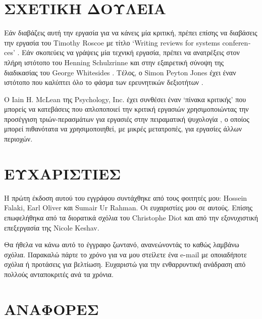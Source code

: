 \documentclass{article}
\begin{document}
\section{ΣΧΕΤΙΚΗ ΔΟΥΛΕΙΑ}
\par
Εάν διαβάζεις αυτή την εργασία για να κάνεις μία κριτική, πρέπει επίσης να διαβάσεις την εργασία του \textlatin{Timothy Roscoe} με τίτλο \textlatin{\enquote*{Writing reviews for systems conferences}} \cite{3writingReviewsForSystemsConferences}. Εάν σκοπεύεις να γράψεις μία τεχνική εργασία, πρέπει να ανατρέξεις στον πλήρη ιστότοπο του \textlatin{Henning Schulzrinne} \cite{4writingTechnicalArticles} και στην εξαιρετική σύνοψη της διαδικασίας του \textlatin{George Whitesides} \cite{5whitesidesGroupWritingAPaper}. Τέλος, ο \textlatin{Simon Peyton Jones} έχει έναν ιστότοπο που καλύπτει όλο το φάσμα των ερευνητικών δεξιοτήτων \cite{2researchSkills}.
\par
Ο \textlatin{Iain H. McLean} της \textlatin{Psychology, Inc.} έχει συνθέσει έναν \textquoteleft πίνακα κριτικής\textlatin{'} που μπορείς να κατεβάσεις που απλοποποιεί την κριτική εργασιών χρησιμοποιώντας την προσέγγιση τριών-περασμάτων για εργασιές στην πειραματική ψυχολογία \cite{1literatureReviewMatrix}, ο οποίος μπορεί πιθανότατα να χρησιμοποιηθεί, με μικρές μετατροπές, για εργασίες άλλων περιοχών.
\section{ΕΥΧΑΡΙΣΤΙΕΣ}
\par
Η πρώτη έκδοση αυτού του εγγράφου συντάχθηκε από τους φοιτητές μου: \textlatin{Hossein Falaki}, \textlatin{Earl Oliver} και \textlatin{Sumair Ur Rahman}. Οι ευχαριστίες μου σε αυτούς. Επίσης επωφελήθηκα από τα διορατικά σχόλια του \textlatin{Christophe Diot} και από την εξονυχιστική επεξεργασία της \textlatin{Nicole Keshav}.
\par
Θα ήθελα να κάνω αυτό το έγγραφο ζωντανό, ανανεώνοντάς το καθώς λαμβάνω σχόλια. Παρακαλώ πάρτε το χρόνο για να μου στείλετε ένα \textlatin{e-mail} με οποιαδήποτε σχόλια ή προτάσεις για βελτίωση. Ευχαριστώ για την ενθαρρυντική ανάδραση από πολλούς ανταποκριτές ανά τα χρόνια.

\section*{ΑΝΑΦΟΡΕΣ}

\end{document}
